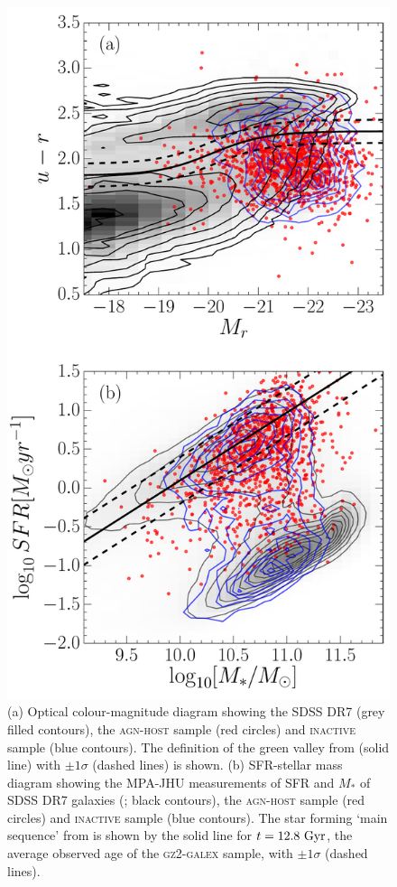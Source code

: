 \begin{figure}
\centering
\includegraphics[height=0.75\textheight]{agn/fig3.pdf}
\caption[Colour-magnitude and SFR-mass diagram for \textsc{agn-host} galaxies]{(a) Optical colour-magnitude diagram showing the SDSS DR7 (grey filled contours), the \textsc{agn-host} sample (red circles) and \textsc{inactive} sample (blue contours). The definition of the green valley from \citet{Baldry06} (solid line) with $\pm 1\sigma$ (dashed lines) is shown. (b) SFR-stellar mass diagram showing the MPA-JHU measurements of SFR and $M_*$ of SDSS DR7 galaxies (\citealt{kauffmann03, brinchmann04}; black contours), the \textsc{agn-host} sample (red circles) and \textsc{inactive} sample (blue contours). The star forming `main sequence' from \citet{peng10} is shown by the solid line for $t = 12.8~\rm{Gyr}$, the average observed age of the \textsc{gz2-galex} sample, with $\pm1\sigma$ (dashed lines).}
\label{cmdsfms}
\end{figure}

